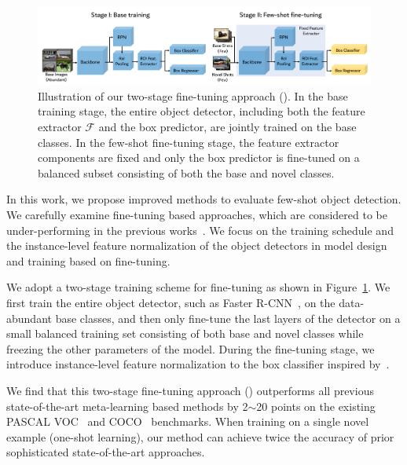 \begin{figure}[ht]
    \centering
    \includegraphics[width=\linewidth]{figs/TFA_fig1.pdf}
    \vspace{-1cm}
    \caption{Illustration of our two-stage fine-tuning approach (\model). In the base training stage, the entire object detector, including both the feature extractor $\mathcal{F}$ and the box predictor, are jointly trained on the base classes. In the few-shot fine-tuning stage, the feature extractor components are fixed and only the box predictor is fine-tuned on a balanced subset consisting of both the base and novel classes.}
    \label{fig:tfa_arch}
\end{figure}

In this work, we propose improved methods to evaluate few-shot object detection. We carefully examine fine-tuning based approaches, which are 
considered to be under-performing in the previous works~\cite{kang2019few,yan2019meta,wang2019meta}.
We focus on the training schedule and the instance-level feature normalization of the object detectors in model design and training based on fine-tuning.

We adopt a two-stage training scheme for fine-tuning as shown in Figure~\ref{fig:tfa_arch}. We first train the entire object detector, such as Faster R-CNN~\cite{ren2015faster}, on the data-abundant base classes, and then only fine-tune the last layers of the detector
on a small balanced training set consisting of both base and novel classes while freezing the other parameters of the model. 
During the fine-tuning stage, we introduce instance-level feature normalization to the box classifier inspired by~\citet{gidaris2018dynamic,qi2018low,chen2019closer}. 


We find that this two-stage fine-tuning approach (\model) outperforms all previous
state-of-the-art meta-learning based methods by 2$\sim$20 points on the existing PASCAL
VOC~\cite{pascal-voc-2007} and COCO~\cite{Lin2014MicrosoftCC} benchmarks. 
When training on a single novel example (one-shot learning), our method can achieve twice
the accuracy of prior sophisticated state-of-the-art approaches.



